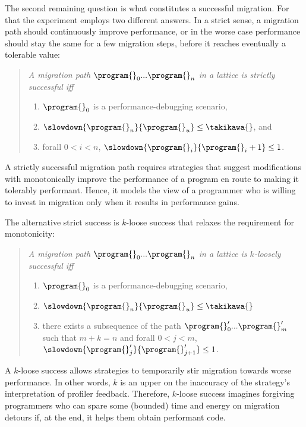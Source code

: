 The second remaining question is what constitutes a successful migration.
For that the experiment employs two different answers. In a strict
sense, a migration path should continuously improve performance, or
in the worse case performance should stay the same for a few migration steps, before
it reaches eventually  a tolerable value: 
\begin{quote}
\it A migration path ${\program{}_0}
  ... {\program{}_n}$ in a lattice 
  is \emph{strictly successful} iff 
  \begin{enumerate}
  \item  $\program{}_0$ is a performance-debugging scenario,
  \item $\slowdown{\program{}_n}{\program{}_u} \leq \takikawa{}$, and 
  \item forall $0 < i < n$, $\slowdown{\program{}_i}{\program{}_i+1} \leq 1$.
  \end{enumerate} 
\end{quote}
\noindent A strictly successful migration path requires
strategies that suggest modifications with monotonically improve the
performance of a program en route to making it tolerably performant.
Hence, it models the view of a programmer who is willing to invest in
migration only when it results in performance gains.

The alternative strict success is $k$-loose success that relaxes the
requirement for monotonicity: 
\begin{quote}
\it A migration path ${\program{}_0}
  ... {\program{}_n}$ in a lattice 
  is \emph{$k$-loosely successful} iff 
  \begin{enumerate}
  \item  $\program{}_0$ is a performance-debugging scenario,
  \item $\slowdown{\program{}_n}{\program{}_u} \leq \takikawa{}$  
  \item there exists a subsequence of the path 
    ${\program{}^\prime_0} ... {\program{}^\prime_m}$ such that
     $m + k = n$ and
      forall $0 < j < m$,
      $\slowdown{\program{}^\prime_j}{\program{}^\prime_{j+1}} \leq 1$.
  \end{enumerate} 
\end{quote}
\noindent A $k$-loose success allows strategies to  temporarily stir migration towards
worse performance. In other words, $k$ 
is an upper on the inaccuracy of the strategy's interpretation of
profiler feedback.
Therefore,  $k$-loose success imagines forgiving
programmers who can spare some (bounded) time and energy on migration
detours if,
at the end, it helps them obtain performant code. 





